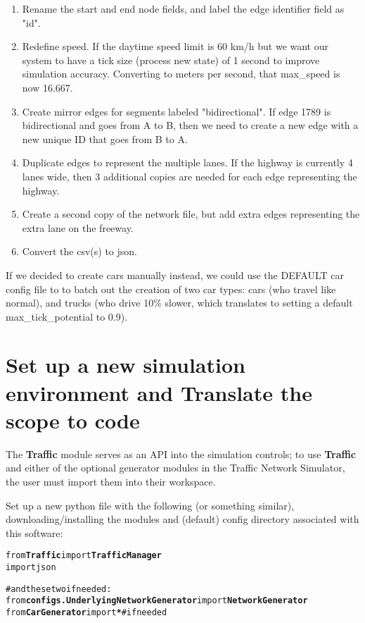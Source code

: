 \begin{enumerate}
    \item Rename the start and end node fields, and label the edge identifier field as "id". 
    \item Redefine speed.  If the daytime speed limit is 60 km/h but we want our system to have a tick size (process new state) of 1 second to improve simulation accuracy.  Converting to meters per second, that max\_speed is now 16.667.
    \item Create mirror edges for segments labeled "bidirectional".  If edge 1789 is bidirectional and goes from A to B, then we need to create a new edge with a new unique ID that goes from B to A.
    \item Duplicate edges to represent the multiple lanes.  If the highway is currently 4 lanes wide, then 3 additional copies are needed for each edge representing the highway.
    \item Create a second copy of the network file, but add extra edges representing the extra lane on the freeway.
    \item Convert the csv(s) to json.
\end{enumerate}

\noindent If we decided to create cars manually instead, we could use the DEFAULT car config file to to batch out the creation of two car types:  cars (who travel like normal), and trucks (who drive 10\% slower, which translates to setting a default max\_tick\_potential to 0.9).



\section{Set up a new simulation environment and Translate the scope to code }

\par The \textbf{Traffic} module serves as an API into the simulation controls; to use \textbf{Traffic} and either of the optional generator modules in the Traffic Network Simulator, the user must import them into their workspace. \\

\par Set up a new python file with the following (or something similar), downloading/installing the modules and (default) config directory associated with this software:

\begin{alltt}
from \textbf{Traffic} import \textbf{TrafficManager}
import json

# and these two if needed:
from \textbf{configs.UnderlyingNetworkGenerator} import \textbf{NetworkGenerator} 
from \textbf{CarGenerator} import \textbf{*}      # if needed
\end{alltt}

